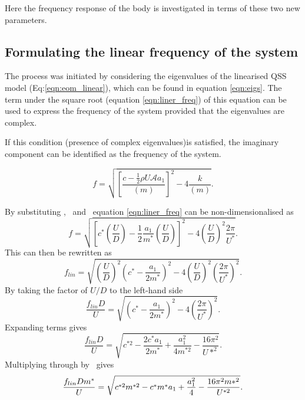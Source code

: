 Here the frequency response of the body is investigated in terms of these two new parameters.

\subsection{Formulating the linear frequency of the system}

The process was initiated by considering the eigenvalues of the linearised QSS model (Eq:\ref{eqn:eom_linear}), which can be found in equation \ref{eqn:eigs}. The term under the square root (equation \ref{eqn:liner_freq}) of this equation can be used to express the frequency of the system provided that the eigenvalues are complex. 

If this condition (presence of complex eigenvalues)is satisfied, the imaginary component can be identified as the frequency of the system. 

\begin{equation}
\label{eqn:liner_freq}
f = \sqrt{\left[\frac{c-\frac{1}{2}\rho U\mathcal{A}a_1}{(m)}\right]^2-4\frac{k}{(m)}}.
\end{equation}



By substituting \cstar, \mstar\ and \ustar\ equation \ref{eqn:liner_freq} can be non-dimensionalised as
%
\begin{equation}
f = \sqrt{\left[c^*\left(\frac{U}{D}\right) - \frac{1}{2}\frac{a_1}{m^*}\left(\frac{U}{D}\right)\right]^2 - 4\left(\frac{U}{D}\right)^2\frac{2\pi}{U^*}}.
\end{equation}
%
This can then be rewritten as
\begin{equation}
f_{lin} = \sqrt{\left(\frac{U}{D}\right)^2\left(c^*-\frac{a_1}{2m^*}\right)^2 - 4\left(\frac{U}{D}\right)^2\left(\frac{2\pi}{U^*}\right)^2}.
\end{equation}
By taking the factor of $U/D$ to the left-hand side
\begin{equation}
\label{eqn:f_lin}
\frac{f_{lin}D}{U} = \sqrt{\left(c^*-\frac{a_1}{2m^*}\right)^2 - 4\left(\frac{2\pi}{U^*}\right)^2}.
\end{equation}
Expanding terms gives
\begin{equation}
\frac{f_{lin}D}{U} = \sqrt{c^{*2} - \frac{2c^*a_1}{2m^*} + \frac{a_1^2}{4m^{*2}} - \frac{16\pi^2}{U*^2}}.
\end{equation}
Multiplying through by \mstar\ gives
\begin{equation}
\frac{f_{lin}Dm^{*}}{U} = \sqrt{c^{*2}m^{*2} - c^*m^*a_1 + \frac{a_1^2}{4} - \frac{16\pi^2m{*^2}}{U^{*2}}}.
\end{equation}


